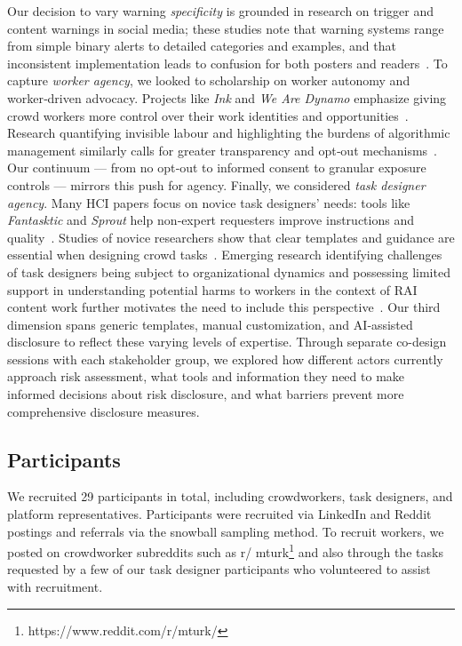 Our decision to vary warning \emph{specificity} is grounded in research on trigger and content warnings in social media; these studies note that warning systems range from simple binary alerts to detailed categories and examples, and that inconsistent implementation leads to confusion for both posters and readers~\cite{Zhang2024PerceptionsTriggerWarnings, bridgland2024meta}. To capture \emph{worker agency}, we looked to scholarship on worker autonomy and worker‑driven advocacy. Projects like \emph{Ink} and \emph{We Are Dynamo} emphasize giving crowd workers more control over their work identities and opportunities~\cite{salehi2018ink,salehi2015we}. Research quantifying invisible labour and highlighting the burdens of algorithmic management similarly calls for greater transparency and opt‑out mechanisms~\cite{toxtli2021quantifying}. Our continuum --- from no opt‑out to informed consent to granular exposure controls --- mirrors this push for agency. Finally, we considered \emph{task designer agency}. Many HCI papers focus on novice task designers’ needs: tools like \emph{Fantasktic} and \emph{Sprout} help non‑expert requesters improve instructions and quality~\cite{gutheim2012fantasktic,bragg2018sprout}. Studies of novice researchers show that clear templates and guidance are essential when designing crowd tasks~\cite{papoutsaki2015crowdsourcing}. Emerging research identifying challenges of task designers being subject to organizational dynamics and possessing limited support in understanding potential harms to workers in the context of RAI content work further motivates the need to include this perspective~\cite{qian2025locating}. Our third dimension spans generic templates, manual customization, and AI‑assisted disclosure to reflect these varying levels of expertise. Through separate co-design sessions with each stakeholder group, we explored how different actors currently approach risk assessment, what tools and information they need to make informed decisions about risk disclosure, and what barriers prevent more comprehensive disclosure measures. 



\subsection{Participants}
We recruited 29 participants in total, including crowdworkers, task designers, and platform representatives. Participants were recruited via LinkedIn and Reddit postings and referrals via the snowball sampling method. To recruit workers, we posted on crowdworker subreddits such as r\slash
mturk\footnote{https://www.reddit.com/r/mturk/} and also through the tasks requested by a few of our task designer participants who volunteered to assist with recruitment. 

